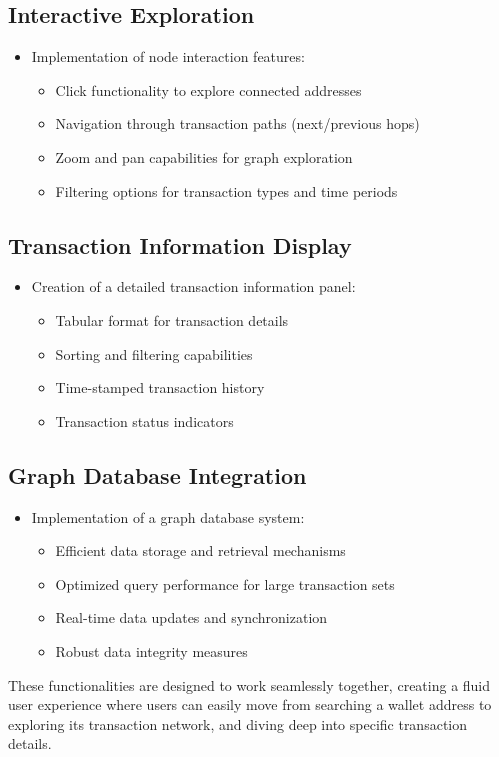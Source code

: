 \subsection{Interactive Exploration}
\begin{itemize}
    \item Implementation of node interaction features:
    \begin{itemize}
        \item Click functionality to explore connected addresses
        \item Navigation through transaction paths (next/previous hops)
        \item Zoom and pan capabilities for graph exploration
        \item Filtering options for transaction types and time periods
    \end{itemize}
\end{itemize}

\subsection{Transaction Information Display}
\begin{itemize}
    \item Creation of a detailed transaction information panel:
    \begin{itemize}
        \item Tabular format for transaction details
        \item Sorting and filtering capabilities
        \item Time-stamped transaction history
        \item Transaction status indicators
    \end{itemize}
\end{itemize}

\subsection{Graph Database Integration}
\begin{itemize}
    \item Implementation of a graph database system:
    \begin{itemize}
        \item Efficient data storage and retrieval mechanisms
        \item Optimized query performance for large transaction sets
        \item Real-time data updates and synchronization
        \item Robust data integrity measures
    \end{itemize}
\end{itemize}
These functionalities are designed to work seamlessly together, creating a fluid user experience where users can easily move from searching a wallet address to exploring its transaction network, and diving deep into specific transaction details.
